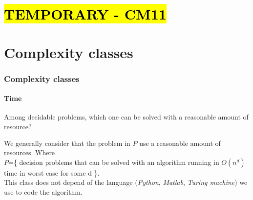 \part*{\hl{TEMPORARY - CM11}}

\part{Complexity classes}

\section{Complexity classes}
\subsection{Time}
Among decidable problems, which one can be solved with a reasonable amount of resource?

We generally consider that the problem in $P$ use a reasonable amount of resources. 
Where \\
$P$=\{
decision problems that can be solved with an algorithm running in 
$O(n^d)$ time in worst case for some d 
\}.\\
This class does not depend of the language (\emph{Python}, \emph{Matlab}, \emph{Turing machine}) we use to code the algorithm.\\

